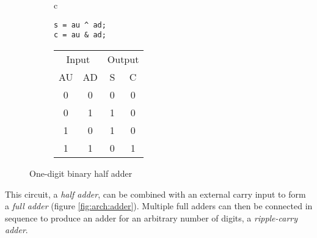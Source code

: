 \begin{figure}[ht]
    \centering
    \begin{subfigure}[h]{0.25\textwidth}
        \begin{tabular}{c}
            \begin{lstlisting}[style=c]
s = au ^ ad;
c = au & ad;
            \end{lstlisting}
        \end{tabular}
    \end{subfigure}
    \begin{subfigure}[h]{0.3\textwidth}
        \begin{tabular}{cc|cc}
            \multicolumn{2}{c|}{Input} &
            \multicolumn{2}{c}{Output} \\
            AU & AD & S & C \\
            \hline
            0 & 0 & 0 & 0 \\
            0 & 1 & 1 & 0 \\
            1 & 0 & 1 & 0 \\
            1 & 1 & 0 & 1 \\
        \end{tabular}
    \end{subfigure}
    \begin{subfigure}[h]{0.4\textwidth}
        
    \end{subfigure}
    \caption{One-digit binary half adder}
    \label{fig:arch:half_adder}
\end{figure}

This circuit, a \textit{half adder}, can be combined with an external carry
input to form a \textit{full adder} (figure \ref{fig:arch:adder}).  Multiple
full adders can then be connected in sequence to produce an adder for an
arbitrary number of digits, a \textit{ripple-carry adder}.

